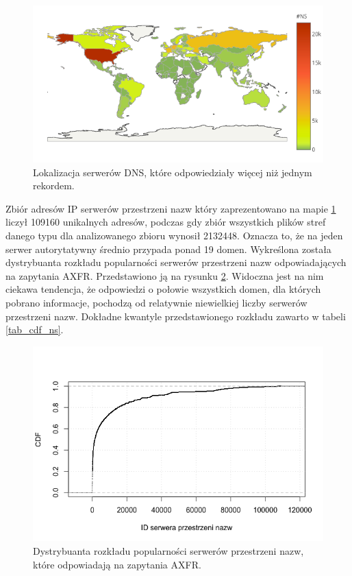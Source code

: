 \begin{figure}[h]
\centering
\includegraphics[width=1.0\textwidth]{image/many_lines_map_no_title}
\caption{Lokalizacja serwerów DNS, które odpowiedziały więcej niż jednym rekordem.}
\label{fig:many_lines_map}
\end{figure}

Zbiór adresów IP serwerów przestrzeni nazw który zaprezentowano na mapie \ref{fig:many_lines_map} liczył 109160 unikalnych adresów, podczas
gdy zbiór wszystkich plików stref danego typu dla analizowanego zbioru wynosił 2132448. Oznacza to, że na jeden serwer autorytatywny
średnio przypada ponad 19 domen. Wykreślona została dystrybuanta rozkładu popularności serwerów przestrzeni nazw odpowiadających na
zapytania AXFR. Przedstawiono ją na rysunku \ref{fig:cdf_ns}. Widoczna jest na nim ciekawa tendencja, że odpowiedzi o połowie
wszystkich domen, dla których pobrano informacje, pochodzą od relatywnie niewielkiej liczby serwerów przestrzeni nazw. Dokładne
kwantyle przedstawionego rozkładu zawarto w tabeli \ref{tab_cdf_ns}.

\begin{figure}[h]
\centering
\includegraphics[width=1.0\textwidth]{image/cdf_ns_responded}
\caption{Dystrybuanta rozkładu popularności serwerów przestrzeni nazw, które odpowiadają na zapytania AXFR.}
\label{fig:cdf_ns}
\end{figure}

